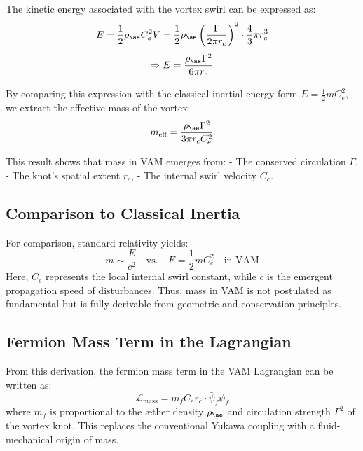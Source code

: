The kinetic energy associated with the vortex swirl can be expressed as:
\[
    E = \frac{1}{2} \rho_{\ae} C_e^2 V = \frac{1}{2} \rho_{\ae} \left( \frac{\Gamma}{2\pi r_c} \right)^2 \cdot \frac{4}{3}\pi r_c^3
\]
\[
    \Rightarrow E = \frac{\rho_{\ae} \Gamma^2}{6\pi r_c}
\]

By comparing this expression with the classical inertial energy form $E = \frac{1}{2} m C_e^2$, we extract the effective mass of the vortex:
\[
    m_\text{eff} = \frac{\rho_{\ae} \Gamma^2}{3\pi r_c C_e^2}
\]

This result shows that mass in VAM emerges from:
- The conserved circulation $\Gamma$,
- The knot’s spatial extent $r_c$,
- The internal swirl velocity $C_e$.

\subsection*{Comparison to Classical Inertia}

For comparison, standard relativity yields:
\[
    m \sim \frac{E}{c^2} \quad \text{vs.} \quad E = \frac{1}{2} m C_e^2 \quad \text{in VAM}
\]
Here, $C_e$ represents the local internal swirl constant, while $c$ is the emergent propagation speed of disturbances. Thus, mass in VAM is not postulated as fundamental but is fully derivable from geometric and conservation principles.

\subsection*{Fermion Mass Term in the Lagrangian}

From this derivation, the fermion mass term in the VAM Lagrangian can be written as:
\[
    \mathcal{L}_\text{mass} = m_f C_e r_c \cdot \bar{\psi}_f \psi_f
\]
where $m_f$ is proportional to the æther density $\rho_{\ae}$ and circulation strength $\Gamma^2$ of the vortex knot. This replaces the conventional Yukawa coupling with a fluid-mechanical origin of mass.
